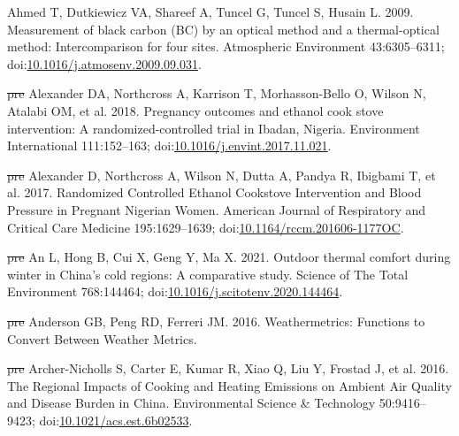 \documentclass[
  letterpaper,
  DIV=11,
  numbers=noendperiod]{scrartcl}
\newlength{\cslhangindent}
\newenvironment{CSLReferences}[2] %
 {\begin{list}{}{%
  \setlength{\itemindent}{0pt} %
  \setlength{\leftmargin}{0pt} %
  \setlength{\parsep}{0pt} %
  \ifodd #1
   \setlength{\leftmargin}{\cslhangindent} %
   \setlength{\itemindent}{-1\cslhangindent} %
  \fi
  \setlength{\itemsep}{#2\baselineskip}}} %
 {\end{list}} %
\providecommand{\DIFdeltex}[1]{{\protect\color{red}\sout{#1}}}                      %
\providecommand{\DIFaddbegin}{} %
\providecommand{\DIFaddend}{} %
\providecommand{\DIFdelbegin}{} %
\providecommand{\DIFdelend}{} %
\providecommand{\DIFdel}[1]{\texorpdfstring{\DIFdeltex{#1}}{}} %
\newcommand{\DIFscaledelfig}{0.5}
\newlength{\DIFdelgraphicswidth} %
\newlength{\DIFdelgraphicsheight} %
\newcommand{\DIFaddincludegraphics}[2][]{{\color{blue}\fbox{\DIFOincludegraphics[#1]{#2}}}} %
\newcommand{\DIFdelincludegraphics}[2][]{%
\sbox{\DIFdelgraphicsbox}{\DIFOincludegraphics[#1]{#2}}%
\settoboxwidth{\DIFdelgraphicswidth}{\DIFdelgraphicsbox} %
\settoboxtotalheight{\DIFdelgraphicsheight}{\DIFdelgraphicsbox} %
\scalebox{\DIFscaledelfig}{%
\parbox[b]{\DIFdelgraphicswidth}{\usebox{\DIFdelgraphicsbox}\\[-\baselineskip] \rule{\DIFdelgraphicswidth}{0em}}\llap{\resizebox{\DIFdelgraphicswidth}{\DIFdelgraphicsheight}{%
\setlength{\unitlength}{\DIFdelgraphicswidth}%
\begin{picture}(1,1)%
\thicklines\linethickness{2pt} %
{\color[rgb]{1,0,0}\put(0,0){\framebox(1,1){}}}%
{\color[rgb]{1,0,0}\put(0,0){\line( 1,1){1}}}%
{\color[rgb]{1,0,0}\put(0,1){\line(1,-1){1}}}%
\end{picture}%
}\hspace*{3pt}}} %
} %
\DeclareRobustCommand{\DIFaddbegin}{\DIFOaddbegin \let\includegraphics\DIFaddincludegraphics} %
\DeclareRobustCommand{\DIFaddend}{\DIFOaddend \let\includegraphics\DIFOincludegraphics} %
\DeclareRobustCommand{\DIFdelbegin}{\DIFOdelbegin \let\includegraphics\DIFdelincludegraphics} %
\DeclareRobustCommand{\DIFdelend}{\DIFOaddend \let\includegraphics\DIFOincludegraphics} %
\begin{document}
\label{refs}
\begin{CSLReferences}{1}{1}
\DIFaddend Ahmed T, Dutkiewicz VA, Shareef A, Tuncel G, Tuncel S, Husain L. 2009.
Measurement of black carbon ({BC}) by an optical method and a
thermal-optical method: {Intercomparison} for four sites. Atmospheric
Environment 43:6305--6311;
doi:\href{https://doi.org/10.1016/j.atmosenv.2009.09.031}{10.1016/j.atmosenv.2009.09.031}.

\DIFdelbegin %
\DIFdel{pre}%
\DIFdelend \DIFaddbegin {}
\DIFaddend Alexander DA, Northcross A, Karrison T, Morhasson-Bello O, Wilson N,
Atalabi OM, et al. 2018. Pregnancy outcomes and ethanol cook stove
intervention: {A} randomized-controlled trial in {Ibadan}, {Nigeria}.
Environment International 111:152--163;
doi:\href{https://doi.org/10.1016/j.envint.2017.11.021}{10.1016/j.envint.2017.11.021}.

\DIFdelbegin %
\DIFdel{pre}%
\DIFdelend \DIFaddbegin {}
\DIFaddend Alexander D, Northcross A, Wilson N, Dutta A, Pandya R, Ibigbami T, et
al. 2017. Randomized {Controlled Ethanol Cookstove Intervention} and
{Blood Pressure} in {Pregnant Nigerian Women}. American Journal of
Respiratory and Critical Care Medicine 195:1629--1639;
doi:\href{https://doi.org/10.1164/rccm.201606-1177OC}{10.1164/rccm.201606-1177OC}.

\DIFdelbegin %
\DIFdel{pre}%
\DIFdelend \DIFaddbegin {}
\DIFaddend An L, Hong B, Cui X, Geng Y, Ma X. 2021. Outdoor thermal comfort during
winter in {China}'s cold regions: {A} comparative study. Science of The
Total Environment 768:144464;
doi:\href{https://doi.org/10.1016/j.scitotenv.2020.144464}{10.1016/j.scitotenv.2020.144464}.

\DIFdelbegin %
\DIFdel{pre}%
\DIFdelend \DIFaddbegin {}
\DIFaddend Anderson GB, Peng RD, Ferreri JM. 2016. Weathermetrics: {Functions} to
{Convert Between Weather Metrics}.

\DIFdelbegin %
\DIFdel{pre}%
\DIFdelend \DIFaddbegin {}
\DIFaddend Archer-Nicholls S, Carter E, Kumar R, Xiao Q, Liu Y, Frostad J, et al.
2016. The {Regional Impacts} of {Cooking} and {Heating Emissions} on
{Ambient Air Quality} and {Disease Burden} in {China}. Environmental
Science \& Technology 50:9416--9423;
doi:\href{https://doi.org/10.1021/acs.est.6b02533}{10.1021/acs.est.6b02533}.


\end{CSLReferences}
\end{document}
